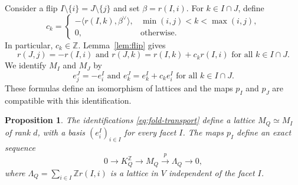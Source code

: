 \documentclass[11pt,a4paper]{article}
\newtheorem{proposition}[theorem]{Proposition}
\theoremstyle{definition}
\theoremstyle{remark}
\numberwithin{equation}{section}
\newcommand{\Z}{\mathbb Z}
\begin{document}
Consider a flip $I\setminus\{i\}=J\setminus\{j\}$ and set $\beta=r(I,i)$. For $k\in I\cap J$, define
\[
c_k=
\begin{cases}
-\langle r(I,k),\beta^\vee\rangle,
&\min(i,j)<k<\max(i,j),\\
0,&\text{otherwise}.
\end{cases}
\]
In particular, $c_k\in\Z$. Lemma~\ref{lem:flip} gives
\[
r(J,j)=-r(I,i) \text{ and } r(J,k)=r(I,k)+c_k r(I,i) \text{ for all } k\in I\cap J.
\]
We identify $M_I$ and $M_J$
by
\begin{equation}\label{eq:fold-transport}
e_j^J=-e_i^I \text{ and } e_k^J=e_k^I+c_k e_i^I \text{ for all } k\in I\cap J.
\end{equation}
These formulas define an isomorphism of lattices and the maps $p_I$ and $p_J$ are compatible with this identification.

\begin{proposition}\label{prop:fold-lattice}
The identifications \eqref{eq:fold-transport} define a lattice $M_Q\simeq M_I$ of rank $d$, with
a basis $(e_i^I)_{i\in I}$ for every facet $I$.
The maps $p_I$ define an exact sequence
\begin{equation}\label{eq:fold-exact}
0\longrightarrow K_Q^{\Z} \longrightarrow M_Q \overset{p}{\longrightarrow}\Lambda_Q\longrightarrow0,
\end{equation}
where $\Lambda_Q=\sum_{i\in I}\Z r(I,i)$ is a lattice in $V$ independent of the facet $I$.
\end{proposition}
\end{document}
